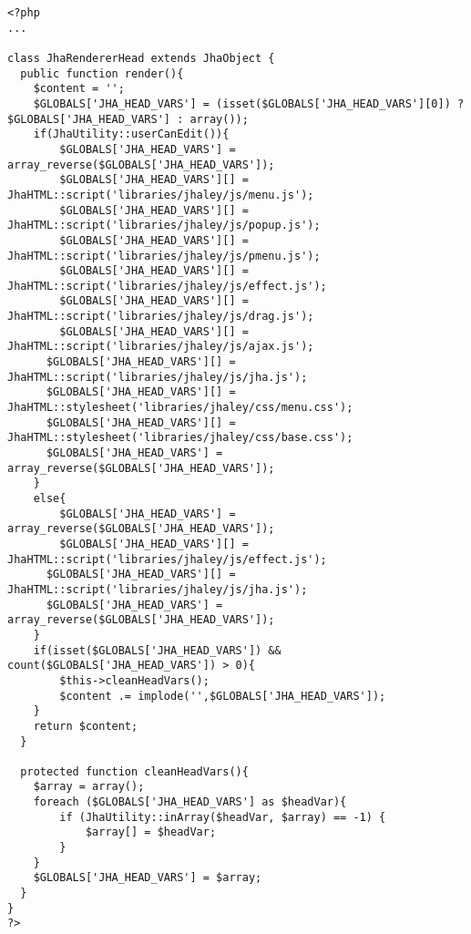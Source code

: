 \begin{lstlisting}[label=jha_renderer_head,caption=Renderizador para el tag HTML `head'.]
<?php
...

class JhaRendererHead extends JhaObject {
  public function render(){
    $content = '';
    $GLOBALS['JHA_HEAD_VARS'] = (isset($GLOBALS['JHA_HEAD_VARS'][0]) ? $GLOBALS['JHA_HEAD_VARS'] : array());
    if(JhaUtility::userCanEdit()){
    	$GLOBALS['JHA_HEAD_VARS'] = array_reverse($GLOBALS['JHA_HEAD_VARS']);
    	$GLOBALS['JHA_HEAD_VARS'][] = JhaHTML::script('libraries/jhaley/js/menu.js');
    	$GLOBALS['JHA_HEAD_VARS'][] = JhaHTML::script('libraries/jhaley/js/popup.js');
    	$GLOBALS['JHA_HEAD_VARS'][] = JhaHTML::script('libraries/jhaley/js/pmenu.js');
    	$GLOBALS['JHA_HEAD_VARS'][] = JhaHTML::script('libraries/jhaley/js/effect.js');
    	$GLOBALS['JHA_HEAD_VARS'][] = JhaHTML::script('libraries/jhaley/js/drag.js');
    	$GLOBALS['JHA_HEAD_VARS'][] = JhaHTML::script('libraries/jhaley/js/ajax.js');
      $GLOBALS['JHA_HEAD_VARS'][] = JhaHTML::script('libraries/jhaley/js/jha.js');
      $GLOBALS['JHA_HEAD_VARS'][] = JhaHTML::stylesheet('libraries/jhaley/css/menu.css');
      $GLOBALS['JHA_HEAD_VARS'][] = JhaHTML::stylesheet('libraries/jhaley/css/base.css');
      $GLOBALS['JHA_HEAD_VARS'] = array_reverse($GLOBALS['JHA_HEAD_VARS']);
    }
    else{
    	$GLOBALS['JHA_HEAD_VARS'] = array_reverse($GLOBALS['JHA_HEAD_VARS']);
    	$GLOBALS['JHA_HEAD_VARS'][] = JhaHTML::script('libraries/jhaley/js/effect.js');
      $GLOBALS['JHA_HEAD_VARS'][] = JhaHTML::script('libraries/jhaley/js/jha.js');
      $GLOBALS['JHA_HEAD_VARS'] = array_reverse($GLOBALS['JHA_HEAD_VARS']);
    }
    if(isset($GLOBALS['JHA_HEAD_VARS']) && count($GLOBALS['JHA_HEAD_VARS']) > 0){
    	$this->cleanHeadVars();
        $content .= implode('',$GLOBALS['JHA_HEAD_VARS']);
    }
    return $content;
  }
  
  protected function cleanHeadVars(){
  	$array = array();
  	foreach ($GLOBALS['JHA_HEAD_VARS'] as $headVar){
  		if (JhaUtility::inArray($headVar, $array) == -1) {
  			$array[] = $headVar;
  		}
  	}
  	$GLOBALS['JHA_HEAD_VARS'] = $array;
  }
}
?>
\end{lstlisting}
